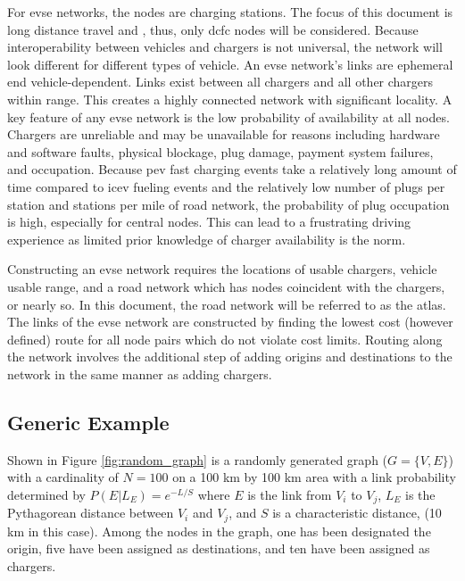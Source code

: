 \documentclass[12pt]{article}
\begin{document}
For \gls{evse} networks, the nodes are charging stations. The focus of this document is long distance travel and , thus, only \gls{dcfc} nodes will be considered. Because interoperability between vehicles and chargers is not universal, the network will look different for different types of vehicle. An \gls{evse} network's links are ephemeral end vehicle-dependent. Links exist between all chargers and all other chargers within range. This creates a highly connected network with significant locality. A key feature of any \gls{evse} network is the low probability of availability at all nodes. Chargers are unreliable and may be unavailable for reasons including hardware and software faults, physical blockage, plug damage, payment system failures, and occupation. Because \gls{pev} fast charging events take a relatively long amount of time compared to \gls{icev} fueling events and the relatively low number of plugs per station and stations per mile of road network, the probability of plug occupation is high, especially for central nodes. This can lead to a frustrating driving experience as limited prior knowledge of charger availability is the norm.

Constructing an \gls{evse} network requires the locations of usable chargers, vehicle usable range, and a road network which has nodes coincident with the chargers, or nearly so. In this document, the road network will be referred to as the atlas. The links of the \gls{evse} network are constructed by finding the lowest cost (however defined) route for all node pairs which do not violate cost limits. Routing along the network involves the additional step of adding origins and destinations to the network in the same manner as adding chargers.

\subsection*{Generic Example}

Shown in Figure \ref{fig:random_graph} is a randomly generated graph ($G = \{V, E\}$) with a cardinality of $N = 100$ on a 100 km by 100 km area with a link probability determined by $P(E|L_E) = e^{-L / S}$ where $E$ is the link from $V_i$ to $V_j$, $L_E$ is the Pythagorean distance between $V_i$ and $V_j$, and $S$ is a characteristic distance, (10 km in this case). Among the nodes in the graph, one has been designated the origin, five have been assigned as destinations, and ten have been assigned as chargers.
\end{document}
